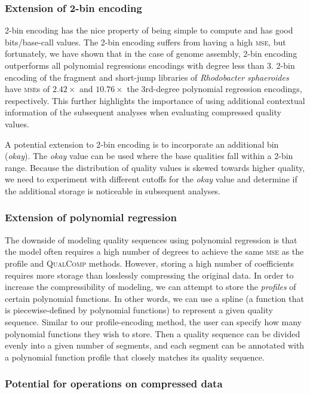 \documentclass[12pt,\mydriver]{thesis}
\begin{document}
\subsubsection{Extension of 2-bin encoding}

2-bin encoding has the nice property of being simple to compute and
has good bits/base-call values. The 2-bin encoding suffers from having
a high \textsc{mse}, but fortunately, we have shown that in the case
of genome assembly, 2-bin encoding outperforms all polynomial
regressions encodings with degree less than 3. 2-bin encoding of the
fragment and short-jump libraries of \textit{Rhodobacter sphaeroides}
have \textsc{mse}s of $2.42\times$ and $10.76\times$ the 3rd-degree
polynomial regression encodings, respectively. This further highlights
the importance of using additional contextual information of the
subsequent analyses when evaluating compressed quality values.

A potential extension to 2-bin encoding is to incorporate an
additional bin (\emph{okay}). The \emph{okay} value can be used where
the base qualities fall within a 2-bin range. Because the distribution
of quality values is skewed towards higher quality, we need to
experiment with different cutoffs for the \emph{okay} value and
determine if the additional storage is noticeable in subsequent
analyses.

\subsubsection{Extension of polynomial regression}

The downside of modeling quality sequences using polynomial regression is that the model often requires a high number of degrees to achieve the same \textsc{mse} as the profile and \textsc{QualComp} methods.
However, storing a high number of coefficients requires more storage than losslessly compressing the original data.
In order to increase the compressibility of modeling, we can attempt to store the \emph{profiles} of certain polynomial functions.
In other words, we can use a spline (a function that is piecewise-defined by polynomial functions) to represent a given quality sequence.
Similar to our profile-encoding method, the user can specify how many polynomial functions they wish to store.
Then a quality sequence can be divided evenly into a given number of segments, and each segment can be annotated with a polynomial function profile that closely matches its quality sequence.

\subsubsection{Potential for operations on compressed data}
\end{document}
